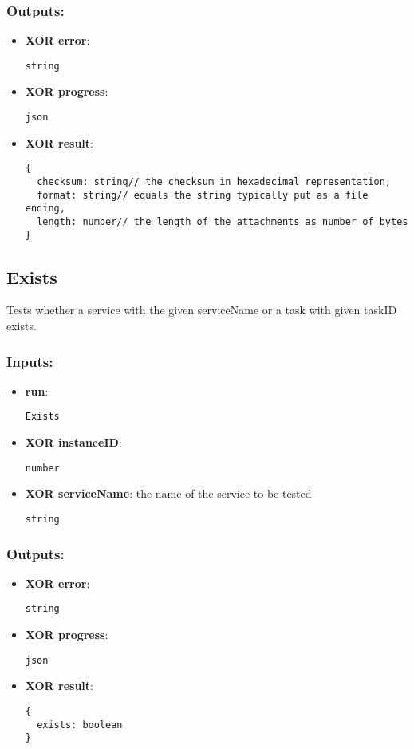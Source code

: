\subsubsection*{Outputs:}
\begin{itemize}
  \small
    \item \textbf{XOR error}: 
\begin{lstlisting}
string
\end{lstlisting}
    \item \textbf{XOR progress}: 
\begin{lstlisting}
json
\end{lstlisting}
    \item \textbf{XOR result}: 
\begin{lstlisting}
{
  checksum: string// the checksum in hexadecimal representation, 
  format: string// equals the string typically put as a file ending, 
  length: number// the length of the attachments as number of bytes
}
\end{lstlisting}
  \end{itemize}

\subsection{Exists}
\label{ch:builtinservices:Exists}
Tests whether a service with the given serviceName or a task with given taskID exists.
\subsubsection*{Inputs:}
\begin{itemize}
  \small
    \item \textbf{run}: 
\begin{lstlisting}
Exists
\end{lstlisting}
    \item \textbf{XOR instanceID}: 
\begin{lstlisting}
number
\end{lstlisting}
    \item \textbf{XOR serviceName}: the name of the service to be tested
\begin{lstlisting}
string
\end{lstlisting}
  \end{itemize}
\subsubsection*{Outputs:}
\begin{itemize}
  \small
    \item \textbf{XOR error}: 
\begin{lstlisting}
string
\end{lstlisting}
    \item \textbf{XOR progress}: 
\begin{lstlisting}
json
\end{lstlisting}
    \item \textbf{XOR result}: 
\begin{lstlisting}
{
  exists: boolean
}
\end{lstlisting}
  \end{itemize}

